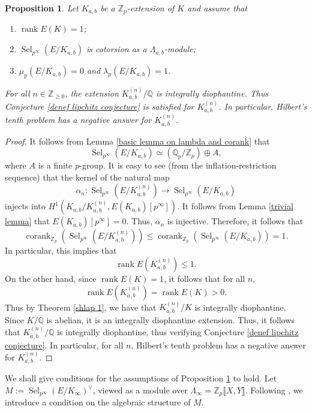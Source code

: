 \documentclass[12pt]{amsart}
\newtheorem{proposition}[theorem]{Proposition}
\newcommand{\Z}{\mathbb{Z}}
\newcommand{\Q}{\mathbb{Q}}
\newcommand{\op}[1]{\operatorname{#1}}
\numberwithin{equation}{section}
\begin{document}
\begin{proposition}\label{propn on H10 for finite layers}Let $K_{a, b}$ be a $\Z_p$-extension of $K$ and assume that 
    \begin{enumerate}
        \item $\op{rank} E(K)=1$;
        \item $\op{Sel}_{p^\infty}(E/K_{a,b})$ is cotorsion as a $\Lambda_{a,b}$-module;
        \item $\mu_p(E/K_{a,b})=0$ and $\lambda_p(E/K_{a,b})=1$.
        \end{enumerate}
        For all $n\in \Z_{\geq 0}$, the extension $K_{a,b}^{(n)}/\Q$ is integrally diophantine. Thus Conjecture \ref{denef lipchitz conjecture} is satisfied for $K_{a,b}^{(n)}$. In particular, Hilbert's tenth problem has a negative answer for $K_{a,b}^{(n)}$.
\end{proposition}
\begin{proof}
    It follows from Lemma \ref{basic lemma on lambda and corank} that 
    \[\op{Sel}_{p^\infty}(E/K_{a,b})\simeq \left(\Q_p/\Z_p\right)\oplus A,\] where $A$ is a finite $p$-group. It is easy to see (from the inflation-restriction sequence) that the kernel of the natural map 
    \[\alpha_n: \op{Sel}_{p^\infty}(E/K_{a,b}^{(n)})\rightarrow \op{Sel}_{p^\infty}(E/K_{a,b})\] injects into $H^1(K_{a,b}/K_{a,b}^{(n)},E(K_{a,b})[p^\infty])$. It follows from Lemma \ref{trivial lemma} that $E(K_{a,b})[p^\infty]=0$. Thus, $\alpha_n$ is injective. Therefore, it follows that 
    \[\op{corank}_{\Z_p}\left( \op{Sel}_{p^\infty}(E/K_{a,b}^{(n)})\right)\leq \op{corank}_{\Z_p}\left( \op{Sel}_{p^\infty}(E/K_{a,b})\right)=1.\]
    In particular, this implies that \[\op{rank} E(K_{a,b}^{(n)})\leq 1.\] On the other hand, since $\op{rank} E(K)=1$, it follows that for all $n$, 
    \[\op{rank} E(K_{a,b}^{(n)})=\op{rank}E(K)>0.\]
    Thus by Theorem \ref{shlap 1}, we have that $K_{a,b}^{(n)}/K$ is integrally diophantine. Since $K/\Q$ is abelian, it is an integrally diophantine extension. Thus, it follows that $K_{a, b}^{(n)}/\Q$ is integrally diophantine, thus verifying Conjecture \ref{denef lipchitz conjecture}. In particular, for all $n$, Hilbert's tenth problem has a negative answer for $K_{a,b}^{(n)}$.
\end{proof}

We shall give conditions for the assumptions of Proposition \ref{propn on H10 for finite layers} to hold. Let $M:=\op{Sel}_{p^\infty}(E/K_\infty)^\vee$, viewed as a module over $\Lambda_\infty=\Z_p\llbracket X, Y\rrbracket$. Following \cite{gajek2024conjecture}, we introduce a condition on the algebraic structure of $M$.
\end{document}
